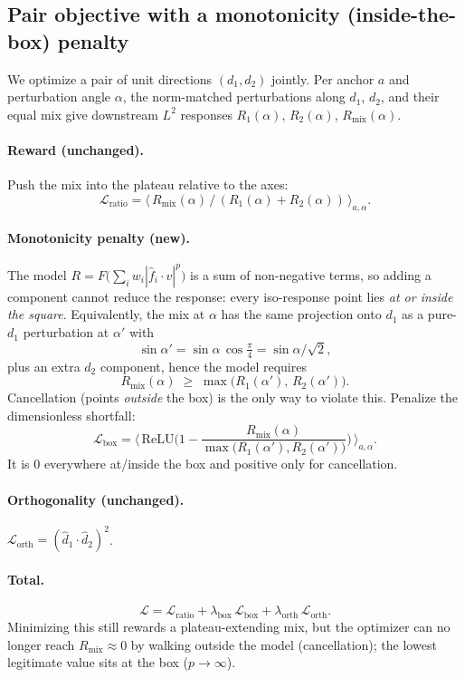 \documentclass[11pt]{article}
\begin{document}
\subsection*{Pair objective with a monotonicity (inside-the-box) penalty}

We optimize a pair of unit directions $(d_1,d_2)$ jointly. Per anchor $a$ and
perturbation angle $\alpha$, the norm-matched perturbations along $d_1$, $d_2$,
and their equal mix give downstream $L^2$ responses $R_1(\alpha)$, $R_2(\alpha)$,
$R_{\mathrm{mix}}(\alpha)$.

\paragraph{Reward (unchanged).} Push the mix into the plateau relative to the
axes:
\[
\mathcal{L}_{\mathrm{ratio}}
= \big\langle\, R_{\mathrm{mix}}(\alpha)\,/\,(R_1(\alpha)+R_2(\alpha)) \,\big\rangle_{a,\alpha}.
\]

\paragraph{Monotonicity penalty (new).} The model
$R=F\!\big(\sum_i w_i|\hat f_i\!\cdot v|^p\big)$ is a sum of non-negative terms,
so adding a component cannot reduce the response: every iso-response point lies
\emph{at or inside the square}. Equivalently, the mix at $\alpha$ has the same
projection onto $d_1$ as a pure-$d_1$ perturbation at $\alpha'$ with
\[
\sin\alpha' = \sin\alpha\,\cos\tfrac{\pi}{4} = \sin\alpha/\sqrt2,
\]
plus an extra $d_2$ component, hence the model requires
\[
R_{\mathrm{mix}}(\alpha) \;\ge\; \max\big(R_1(\alpha'),\,R_2(\alpha')\big).
\]
Cancellation (points \emph{outside} the box) is the only way to violate this.
Penalize the dimensionless shortfall:
\[
\mathcal{L}_{\mathrm{box}}
= \Big\langle\, \mathrm{ReLU}\!\Big(1 - \frac{R_{\mathrm{mix}}(\alpha)}{\max\big(R_1(\alpha'),R_2(\alpha')\big)}\Big) \,\Big\rangle_{a,\alpha}.
\]
It is $0$ everywhere at/inside the box and positive only for cancellation.

\paragraph{Orthogonality (unchanged).}
$\mathcal{L}_{\mathrm{orth}} = (\hat d_1\!\cdot\hat d_2)^2$.

\paragraph{Total.}
\[
\mathcal{L} = \mathcal{L}_{\mathrm{ratio}}
+ \lambda_{\mathrm{box}}\,\mathcal{L}_{\mathrm{box}}
+ \lambda_{\mathrm{orth}}\,\mathcal{L}_{\mathrm{orth}}.
\]
Minimizing this still rewards a plateau-extending mix, but the optimizer can no
longer reach $R_{\mathrm{mix}}\!\approx\!0$ by walking outside the model
(cancellation); the lowest legitimate value sits at the box ($p\to\infty$).
\end{document}
